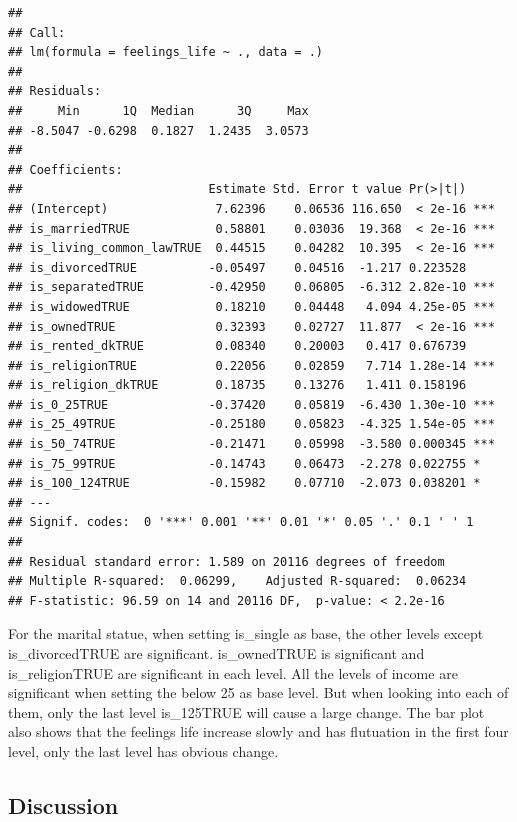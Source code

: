 \documentclass[]{article}
\begin{document}
\begin{verbatim}
## 
## Call:
## lm(formula = feelings_life ~ ., data = .)
## 
## Residuals:
##     Min      1Q  Median      3Q     Max 
## -8.5047 -0.6298  0.1827  1.2435  3.0573 
## 
## Coefficients:
##                          Estimate Std. Error t value Pr(>|t|)    
## (Intercept)               7.62396    0.06536 116.650  < 2e-16 ***
## is_marriedTRUE            0.58801    0.03036  19.368  < 2e-16 ***
## is_living_common_lawTRUE  0.44515    0.04282  10.395  < 2e-16 ***
## is_divorcedTRUE          -0.05497    0.04516  -1.217 0.223528    
## is_separatedTRUE         -0.42950    0.06805  -6.312 2.82e-10 ***
## is_widowedTRUE            0.18210    0.04448   4.094 4.25e-05 ***
## is_ownedTRUE              0.32393    0.02727  11.877  < 2e-16 ***
## is_rented_dkTRUE          0.08340    0.20003   0.417 0.676739    
## is_religionTRUE           0.22056    0.02859   7.714 1.28e-14 ***
## is_religion_dkTRUE        0.18735    0.13276   1.411 0.158196    
## is_0_25TRUE              -0.37420    0.05819  -6.430 1.30e-10 ***
## is_25_49TRUE             -0.25180    0.05823  -4.325 1.54e-05 ***
## is_50_74TRUE             -0.21471    0.05998  -3.580 0.000345 ***
## is_75_99TRUE             -0.14743    0.06473  -2.278 0.022755 *  
## is_100_124TRUE           -0.15982    0.07710  -2.073 0.038201 *  
## ---
## Signif. codes:  0 '***' 0.001 '**' 0.01 '*' 0.05 '.' 0.1 ' ' 1
## 
## Residual standard error: 1.589 on 20116 degrees of freedom
## Multiple R-squared:  0.06299,    Adjusted R-squared:  0.06234 
## F-statistic: 96.59 on 14 and 20116 DF,  p-value: < 2.2e-16
\end{verbatim}

For the marital statue, when setting is\_single as base, the other
levels except is\_divorcedTRUE are significant. is\_ownedTRUE is
significant and is\_religionTRUE are significant in each level. All the
levels of income are significant when setting the below 25 as base
level. But when looking into each of them, only the last level
is\_125TRUE will cause a large change. The bar plot also shows that the
feelings life increase slowly and has flutuation in the first four
level, only the last level has obvious change.

\hypertarget{discussion}{%
\subsection{Discussion}\label{discussion}}
\end{document}
